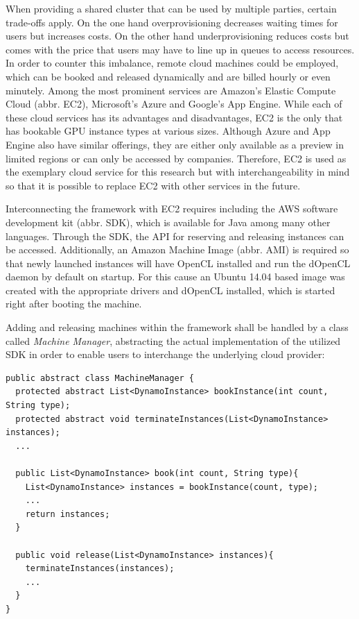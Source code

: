 When providing a shared cluster that can be used by multiple parties, certain trade-offs apply. On the one hand overprovisioning decreases waiting times for users but increases costs. On the other hand underprovisioning reduces costs but comes with the price that users may have to line up in queues to access resources. In order to counter this imbalance, remote cloud machines could be employed, which can be booked and released dynamically and are billed hourly or even minutely. Among the most prominent services are Amazon's Elastic Compute Cloud (abbr. EC2), Microsoft's Azure and Google's App Engine. While each of these cloud services has its advantages and disadvantages, EC2 is the only that has bookable GPU instance types at various sizes. Although Azure and App Engine also have similar offerings, they are either only available as a preview in limited regions or can only be accessed by companies. Therefore, EC2 is used as the exemplary cloud service for this research but with interchangeability in mind so that it is possible to replace EC2 with other services in the future.

Interconnecting the framework with EC2 requires including the AWS software development kit (abbr. SDK), which is available for Java among many other languages. Through the SDK, the API for reserving and releasing instances can be accessed. Additionally, an Amazon Machine Image (abbr. AMI) is required so that newly launched instances will have OpenCL installed and run the dOpenCL daemon by default on startup. For this cause an Ubuntu 14.04 based image was created with the appropriate drivers and dOpenCL installed, which is started right after booting the machine.

Adding and releasing machines within the framework shall be handled by a class called \textit{Machine Manager}, abstracting the actual implementation of the utilized SDK in order to enable users to interchange the underlying cloud provider:


\begin{lstlisting}
public abstract class MachineManager {
  protected abstract List<DynamoInstance> bookInstance(int count, String type);
  protected abstract void terminateInstances(List<DynamoInstance> instances);
  ...

  public List<DynamoInstance> book(int count, String type){
    List<DynamoInstance> instances = bookInstance(count, type);
    ...
    return instances;
  }

  public void release(List<DynamoInstance> instances){
    terminateInstances(instances);
    ...
  }
}
\end{lstlisting}

